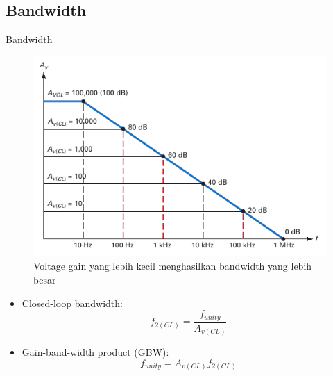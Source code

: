 \subsection{Bandwidth}
\begin{frame}{Bandwidth}
	\begin{multicols}{2}
		\begin{figure}
			\centering
			\includegraphics[height=0.6\textheight]{gambar/fig-16.15}
			\caption{Voltage gain yang lebih kecil menghasilkan bandwidth yang lebih besar}
			\label{fig-16.15}
		\end{figure}
	\columnbreak
		\begin{itemize}
			\item Closed-loop bandwidth:
			\begin{equation}\label{pers.16.5}
				f_{2(CL)} = \frac{f_{unity}}{A_{v(CL)}}
			\end{equation}
			\item Gain-band-width product (GBW):
			\begin{equation}\label{pers.16.6}
				f_{unity} = A_{v(CL)}f_{2(CL)}
			\end{equation}
		\end{itemize}
	\end{multicols}
\end{frame}

